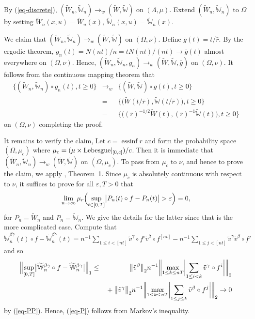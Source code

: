 \documentclass[aop,MSNbibl,seceqn,dvips]{arximspdf}
\newcommand{\eqref}[1]{(\ref{#1})}
\newcommand{\tildev}{\tilde{v}}
\newcommand{\tildeW}{\widetilde{W}}
\newcommand{\tildeBBW}{\widetilde{\mathbb W}}
\begin{document}
\begin{pf}
By \eqref{eq-discrete},\vspace*{1pt} $(\tildeW_n,\tildeBBW_n)\to_w(\tildeW
,\tildeBBW)$
on $(\Lambda,\mu)$.
Extend $(\tildeW_n,\tildeBBW_n)$ to $\Omega$ by setting
$\tildeW_n(x,u)=\tildeW_n(x)$,
$\tildeBBW_n(x,u)=\tildeBBW_n(x)$.

We claim that
$(\tildeW_n,\tildeBBW_n)\to_w (\tildeW,\tildeBBW)$ on $(\Omega
,\nu)$.
Define $\bar g(t)=t/\bar r$.
By the ergodic theorem,
$g_n(t)=N(nt)/n=tN(nt)/(nt)\to\bar g(t)$ almost everywhere on $(\Omega
,\nu)$.
Hence, $(\tildeW_n,\tildeBBW_n,g_n)\to_w(\tildeW,\tildeBBW,\bar
g)$ on
$(\Omega,\nu)$.
It follows from the continuous mapping theorem that
%
\begin{eqnarray*}
\bigl\{(\tildeW_n,\tildeBBW_n)\circ g_n(t),
t\ge0\bigr\} & \to_w& \bigl\{(\tildeW,\tildeBBW)\circ g(t), t\ge0
\bigr\}
\\
& =&\bigl\{ \bigl(\tildeW(t/\bar r),\tildeBBW(t/\bar r)\bigr), t\ge0\bigr\}
\\
& =&\bigl\{ \bigl((\bar r)^{-1/2}\tildeW(t),(\bar r)^{-1}
\tildeBBW(t)\bigr), t\ge0\bigr\}
\end{eqnarray*}
%
on $(\Omega,\nu)$ completing the proof.

It remains to verify the claim,
Let $c=\operatorname{ess inf} r$
and form the probability space $(\Omega,\mu_c)$
where $\mu_c=(\mu\times{\rm Lebesgue}|_{[0,c]})/c$.
Then it is immediate that $(\tildeW_n,\tildeBBW_n)\to_w (\tildeW
,\tildeBBW)$ on $(\Omega,\mu_c)$.
To pass from $\mu_c$ to $\nu$, and hence to prove the claim, we
apply \cite{Zweimueller07}, Theorem~1.
Since $\mu_c$ is absolutely continuous with respect to $\nu$, it
suffices to prove for all
$\varepsilon,T>0$ that
%
\begin{equation}
\label{eq-P} \lim_{n\to\infty}\mu_r \Bigl(\sup
_{t\in[0,T]}\bigl|P_n(t)\circ f-P_n(t)\bigr|>
\varepsilon \Bigr)=0,
\end{equation}
%
for $P_n=\tildeW_n$ and $P_n=\tildeBBW_n$.
We give the details for the latter since that is the more complicated case.
Compute that
$\tildeBBW_n^{\beta\gamma}(t)\circ f-\tildeBBW_n^{\beta\gamma
}(t)=n^{-1} \sum_{1\le i<[nt]}\tildev^\gamma\circ f^i \tildev^\beta
\circ f^{[nt]}
-n^{-1} \sum_{1\le j<[nt]}\tildev^\gamma \tildev^\beta\circ f^j$
and so
%
\begin{eqnarray*}
\Bigl\|\sup_{[0,T]}\bigl|\tildeBBW_n^{\beta\gamma}\circ f-
\tildeBBW _n^{\beta
\gamma}\bigr| \Bigr\|_1 & \le&\bigl\|
\tildev^\beta\bigr\|_2 n^{-1} \biggl\|\max
_{1\le
k\le nT} \biggl|\sum_{1\le i<k}
\tildev^\gamma\circ f^i \biggr|\biggr \|_2
\\
& &{}+ \bigl\|\tildev^\gamma\bigr\|_2 n^{-1}\biggl \|\max
_{1\le k\le
nT} \biggl|\sum_{1\le j\le k}
\tildev^\beta\circ f^j \biggr| \biggr\|_2 \to0
\end{eqnarray*}
%
by \eqref{eq-PP}.
Hence, \eqref{eq-P} follows from Markov's inequality.
\end{pf}
\end{document}
